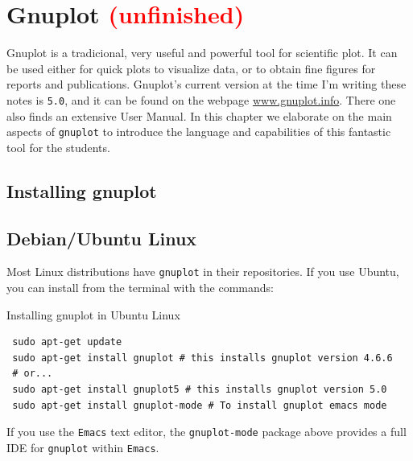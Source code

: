 \section{Gnuplot \textcolor{red}{(unfinished)}}

 \newcommand{\gphome}{\begin{large}Homework \arabic{gnuplothomework}\end{large}}
  \newcommand{\gpexample}{Example \arabic{gnuplotexample}}


Gnuplot is a tradicional, very useful and powerful tool for scientific plot. It can be used either for quick plots to visualize data, or to obtain fine figures for reports and publications. Gnuplot's current version at the time I'm writing these notes is \texttt{5.0}, and it can be found on the webpage \url{www.gnuplot.info}. There one also finds an extensive User Manual. In this chapter we elaborate on the main aspects of \texttt{gnuplot} to introduce the language and capabilities of this fantastic tool for the students.

\subsection{Installing gnuplot}

\subsection*{Debian/Ubuntu Linux}

Most Linux distributions have \texttt{gnuplot} in their repositories. If you use Ubuntu, you can install from the terminal with the commands:

\begin{example}{Installing gnuplot in Ubuntu Linux}
\begin{verbatim}
 sudo apt-get update
 sudo apt-get install gnuplot # this installs gnuplot version 4.6.6
 # or...
 sudo apt-get install gnuplot5 # this installs gnuplot version 5.0
 sudo apt-get install gnuplot-mode # To install gnuplot emacs mode
\end{verbatim}
\end{example}

If you use the \texttt{Emacs} text editor, the \texttt{gnuplot-mode} package above provides a full IDE for \texttt{gnuplot} within \texttt{Emacs}.

